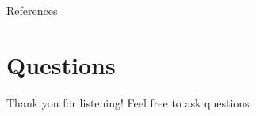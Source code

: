 \begin{frame}{References}
  \scriptsize
  
  
\end{frame}

\section{Questions}

\begin{frame}
  \centering

  \huge Thank you for listening!
  \vskip 1cm
  \large Feel free to ask questions

\end{frame}
